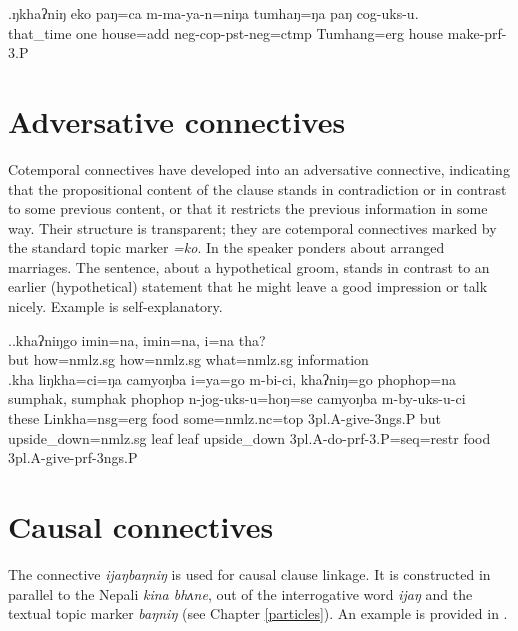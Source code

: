 \exg.ŋkhaʔniŋ eko paŋ=ca         m-ma-ya-n=niŋa tumhaŋ=ŋa   paŋ  cog-uks-u.\\
that\_time one house{\sc =add} {\sc neg-cop-pst-neg=ctmp} Tumhang{\sc =erg} house make{\sc -prf-3.P}\\
 


\section{Adversative connectives}

Cotemporal connectives have developed into an adversative connective, indicating that the propositional content of the clause stands in contradiction or in contrast to some previous content, or that it restricts the previous information in some way. Their structure is transparent; they are cotemporal connectives marked by the standard topic marker \emph{=ko}. In \Next[a] the speaker ponders about arranged marriages. The sentence, about  a hypothetical groom, stands in contrast to an earlier (hypothetical) statement that he might leave a good impression or talk nicely. Example  \Next[b] is self-explanatory.

\ex.\ag.khaʔniŋgo imin=na,       imin=na,       i=na           tha?\\
but how{\sc =nmlz.sg} how{\sc =nmlz.sg} what{\sc =nmlz.sg} information\\
  
\bg.kha liŋkha=ci=ŋa camyoŋba i=ya=go m-bi-ci, khaʔniŋ=go phophop=na sumphak, sumphak phophop n-jog-uks-u=hoŋ=se camyoŋba m-by-uks-u-ci\\
these Linkha{\sc =nsg=erg} food some{\sc =nmlz.nc=top} {\sc 3pl.A-}give{\sc -3ngs.P} but upside\_down{\sc =nmlz.sg} leaf leaf upside\_down  {\sc 3pl.A-}do{\sc -prf-3.P=seq=restr} food {\sc 3pl.A-}give{\sc -prf-3ngs.P}\\
 

\section{Causal connectives}

The connective \emph{ijaŋbaŋniŋ}  is used for causal clause linkage. It is constructed in parallel to the Nepali \emph{kina bhʌne}, out of the interrogative word \emph{ijaŋ}  and the textual topic marker \emph{baŋniŋ} (see Chapter \ref{particles}). An example is provided in \Next.

